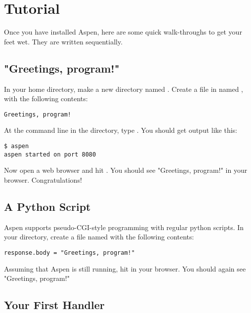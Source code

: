 \chapter{Tutorial \label{tutorial}}

Once you have installed Aspen, here are some quick walk-throughs to get your
feet wet. They are written sequentially.


\section{"Greetings, program!" \label{tutorial-greetings-program}}

In your home directory, make a new directory named . Create a
file in  named , with the following contents:

\begin{verbatim}
Greetings, program!
\end{verbatim}

At the command line in the  directory, type . You
should get output like this:

\begin{verbatim}
$ aspen
aspen started on port 8080
\end{verbatim}

Now open a web browser and hit . You should see
"Greetings, program!" in your browser. Congratulations!


\section{A Python Script \label{tutorial-pyscript}}

Aspen supports pseudo-CGI-style programming with regular python scripts. In your
 directory, create a file named  with the following
contents:

\begin{verbatim}
response.body = "Greetings, program!"
\end{verbatim}

Assuming that Aspen is still running, hit  in
your browser. You should again see "Greetings, program!"


\section{Your First Handler \label{tutorial-handler}}

